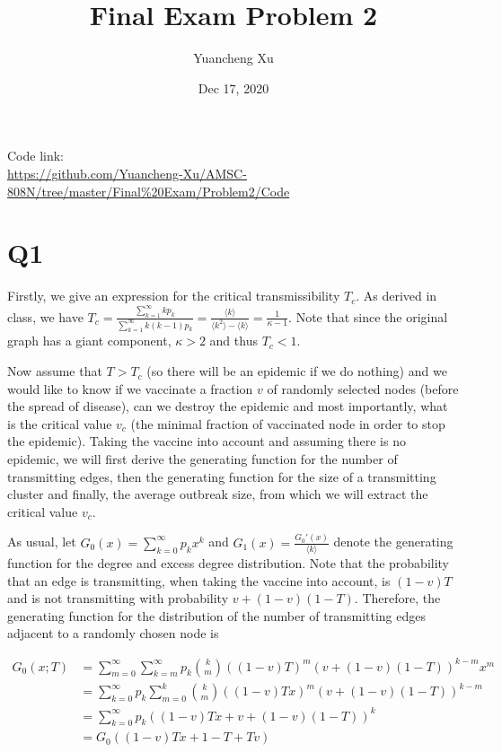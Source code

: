 \documentclass{article}
\title{Final Exam Problem 2 }
\author{Yuancheng Xu}
\date{Dec 17, 2020}
\begin{document}
\maketitle

\noindent Code link:\\
\url{https://github.com/Yuancheng-Xu/AMSC-808N/tree/master/Final%20Exam/Problem2/Code}\\

\section*{Q1}
Firstly, we give an expression for the critical transmissibility $ T_c $. As derived in class, we have $ T_c =  \frac{\sum_{k=1}^{\infty}kp_k}{\sum_{k=1}^{\infty}k(k-1)p_k} = \frac{\langle k \rangle}{\langle k^2 \rangle - \langle k \rangle} = \frac{1}{\kappa - 1}$. Note that since the original graph has a giant component, $ \kappa > 2 $ and thus $ T_c <1 $.

Now assume that $ T > T_c $ (so there will be an epidemic if we do nothing) and we would like to know  if we vaccinate a fraction $ v $ of randomly selected nodes (before the spread of disease), can we destroy the epidemic and most importantly, what is the critical value $ v_c $ (the minimal fraction of vaccinated node in order to stop the epidemic). Taking the vaccine into account and assuming there is no epidemic, we will first derive the generating function for the number of transmitting edges, then the generating function for the size of a transmitting cluster and finally, the average outbreak size, from which we will extract the critical value $ v_c $.

As usual, let $ G_0(x) = \sum_{k=0}^{\infty}p_k x^k $ and $ G_1(x) =\frac{G_0'(x)}{\langle k \rangle} $ denote the generating function for the degree and excess degree distribution. Note that the probability that an edge is transmitting, when taking the vaccine into account, is $ (1-v)T $ and is not transmitting with probability $ v + (1-v)(1-T) $. Therefore, the generating function for the distribution of the number of transmitting edges adjacent to a randomly chosen node is 

\begin{equation}\label{G_0}
	\begin{aligned}
		G_0(x;T) & = \sum_{m=0}^{\infty}\sum_{k=m}^{\infty}p_k \binom{k}{m}((1-v)T)^m (v+(1-v)(1-T))^{k-m}x^m \\
		& = \sum_{k=0}^{\infty}p_k\sum_{m=0}^{k} \binom{k}{m}((1-v)Tx)^m (v+(1-v)(1-T))^{k-m}\\
		& = \sum_{k=0}^{\infty}p_k ((1-v)Tx + v+(1-v)(1-T) )^k \\ 
		& = G_0((1-v)Tx + 1 - T + Tv)
	\end{aligned}
\end{equation}
\end{document}

